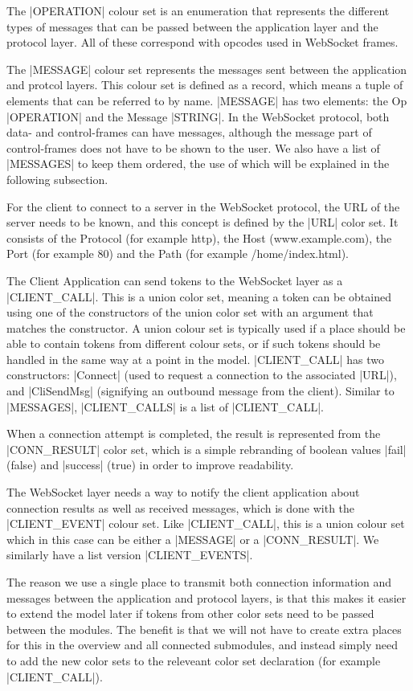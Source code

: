	The |OPERATION| colour set is an enumeration that represents the
	different types of messages that can be passed between the application layer
	and the protocol layer. All of these correspond with opcodes used in WebSocket
	frames.
	
	The |MESSAGE| colour set represents the messages sent between the
	application and protcol layers. This colour set is defined as a record, which
	means a tuple of elements that can be referred to by name. |MESSAGE| has two
	elements: the Op |OPERATION| and the Message |STRING|. In the WebSocket
	protocol, both data- and control-frames can have messages, although the message
	part of control-frames does not have to be shown to the user. We also have a
	list of |MESSAGES| to keep them ordered, the use of which will be explained in
	the following subsection.
	
	For the client to connect to a server in the WebSocket protocol, the URL
	of the server needs to be known, and this concept is defined by the |URL| color
	set. It consists of the Protocol (for example http), the Host
	(www.example.com), the Port (for example 80) and the Path (for example
	/home/index.html).
	
	The Client Application can send tokens to the WebSocket layer as a
	|CLIENT_CALL|. This is a union color set, meaning a token can be obtained
	using one of the constructors of the union color set with an argument that
	matches the constructor. A union colour set is typically used if a place should
	be able to contain tokens from different colour sets, or if such tokens should
	be handled in the same way at a  point in the model. |CLIENT_CALL| has two
	constructors: |Connect| (used to request a connection to the associated |URL|),
	and |CliSendMsg| (signifying an outbound message from the client). Similar
	to |MESSAGES|, |CLIENT_CALLS| is a list of |CLIENT_CALL|.
	
	When a connection attempt is completed, the result is represented from the
	|CONN_RESULT| color set, which is a simple rebranding of boolean values
	|fail| (false) and |success| (true) in order to improve readability.
	
	The WebSocket layer needs a way to notify the client application about 
	connection results as well as received messages, which is done with the
	|CLIENT_EVENT| colour set. Like |CLIENT_CALL|, this is a union colour set which
	in this case can be either a |MESSAGE| or a |CONN_RESULT|. We similarly
	have a list version |CLIENT_EVENTS|.
	
	
	The reason we use a single place to transmit both connection information and
	messages between the application and protocol layers, is that this makes it
	easier to extend the model later if tokens from other color sets need to be passed
	between the modules. The benefit is that we will not have to create extra places for
	this in the overview and all connected submodules, and instead simply need to
	add the new color sets to the releveant color set declaration (for example
	|CLIENT_CALL|).
	

